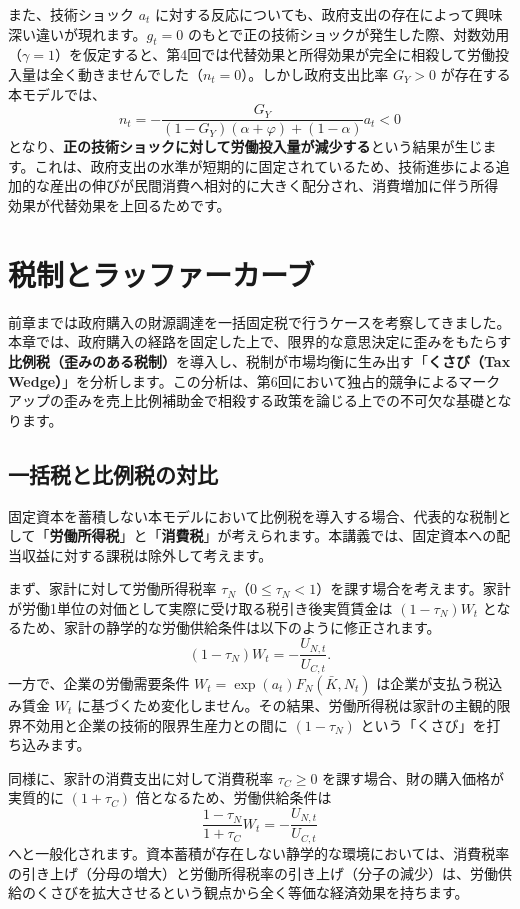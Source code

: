\documentclass[
  japanese,
  lualatex,
  ja=standard,
  12pt,
  a4paper]{ltjsarticle}
\begin{document}
また、技術ショック \(a_t\)
に対する反応についても、政府支出の存在によって興味深い違いが現れます。\(g_t = 0\)
のもとで正の技術ショックが発生した際、対数効用（\(\gamma = 1\)）を仮定すると、第4回では代替効果と所得効果が完全に相殺して労働投入量は全く動きませんでした（\(n_t = 0\)）。しかし政府支出比率
\(G_Y > 0\) が存在する本モデルでは、 \[
n_t = -\frac{G_Y}{(1-G_Y)(\alpha+\varphi) + (1-\alpha)} a_t < 0
\]
となり、\textbf{正の技術ショックに対して労働投入量が減少する}という結果が生じます。これは、政府支出の水準が短期的に固定されているため、技術進歩による追加的な産出の伸びが民間消費へ相対的に大きく配分され、消費増加に伴う所得効果が代替効果を上回るためです。

\section{税制とラッファーカーブ}\label{ux7a0eux5236ux3068ux30e9ux30c3ux30d5ux30a1ux30fcux30abux30fcux30d6}

前章までは政府購入の財源調達を一括固定税で行うケースを考察してきました。本章では、政府購入の経路を固定した上で、限界的な意思決定に歪みをもたらす\textbf{比例税（歪みのある税制）}を導入し、税制が市場均衡に生み出す「\textbf{くさび（Tax
Wedge）}」を分析します。この分析は、第6回において独占的競争によるマークアップの歪みを売上比例補助金で相殺する政策を論じる上での不可欠な基礎となります。

\subsection{一括税と比例税の対比}\label{ux4e00ux62ecux7a0eux3068ux6bd4ux4f8bux7a0eux306eux5bfeux6bd4}

固定資本を蓄積しない本モデルにおいて比例税を導入する場合、代表的な税制として「\textbf{労働所得税}」と「\textbf{消費税}」が考えられます。本講義では、固定資本への配当収益に対する課税は除外して考えます。

まず、家計に対して労働所得税率
\(\tau_N\)（\(0 \leq \tau_N < 1\)）を課す場合を考えます。家計が労働1単位の対価として実際に受け取る税引き後実質賃金は
\((1-\tau_N)W_t\)
となるため、家計の静学的な労働供給条件は以下のように修正されます。 \[
(1-\tau_N) W_t = -\frac{U_{N,t}}{U_{C,t}}.
\] 一方で、企業の労働需要条件 \(W_t = \exp(a_t) F_N(\bar{K}, N_t)\)
は企業が支払う税込み賃金 \(W_t\)
に基づくため変化しません。その結果、労働所得税は家計の主観的限界不効用と企業の技術的限界生産力との間に
\((1-\tau_N)\) という「くさび」を打ち込みます。

同様に、家計の消費支出に対して消費税率 \(\tau_C \geq 0\)
を課す場合、財の購入価格が実質的に \((1+\tau_C)\)
倍となるため、労働供給条件は \[
\frac{1-\tau_N}{1+\tau_C} W_t = -\frac{U_{N,t}}{U_{C,t}}
\]
へと一般化されます。資本蓄積が存在しない静学的な環境においては、消費税率の引き上げ（分母の増大）と労働所得税率の引き上げ（分子の減少）は、労働供給のくさびを拡大させるという観点から全く等価な経済効果を持ちます。
\end{document}
